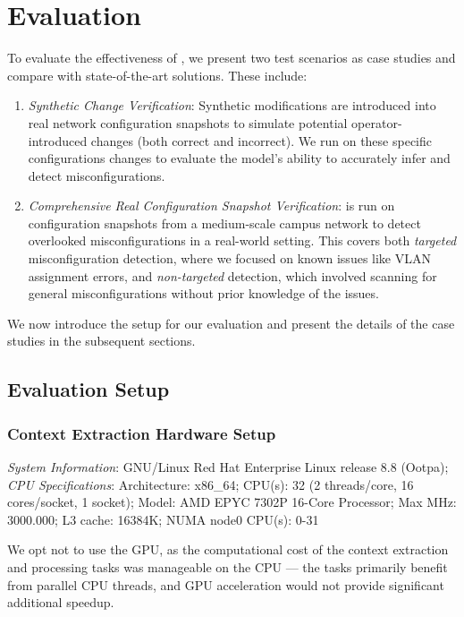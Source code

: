 \section{Evaluation}
\label{sec:eval}
To evaluate the effectiveness of \sysname{}, we present two test scenarios as case studies and compare \sysname{} with state-of-the-art solutions. These include:

\begin{enumerate}
    \item \textit{Synthetic Change Verification}: Synthetic modifications are introduced into real network configuration snapshots to simulate potential operator-introduced changes (both correct and incorrect). We run \sysname{} on these specific configurations changes to evaluate the model’s ability to accurately infer and detect misconfigurations.
    \item \textit{Comprehensive Real Configuration Snapshot Verification}: \sysname{} is run on configuration snapshots from a medium-scale campus network to detect overlooked misconfigurations in a real-world setting. This covers both \textit{targeted} misconfiguration detection, where we focused on known issues like VLAN assignment errors, and \textit{non-targeted} detection, which involved scanning for general misconfigurations without prior knowledge of the issues.
\end{enumerate}

We now introduce the setup for our evaluation and present the details of the case studies in the subsequent sections.


\subsection{Evaluation Setup}
\subsubsection{Context Extraction Hardware Setup}


\textit{System Information}: GNU/Linux Red Hat Enterprise Linux release 8.8 (Ootpa); 
\textit{CPU Specifications}: Architecture: x86\_64; CPU(s): 32 (2 threads/core, 16 cores/socket, 1 socket); Model: AMD EPYC 7302P 16-Core Processor; Max MHz: 3000.000; L3 cache: 16384K; NUMA node0 CPU(s): 0-31 

We opt not to use the GPU, as the computational cost of the context extraction and processing tasks was manageable on the CPU --- the tasks primarily benefit from parallel CPU threads, and GPU acceleration would not provide significant additional speedup.



